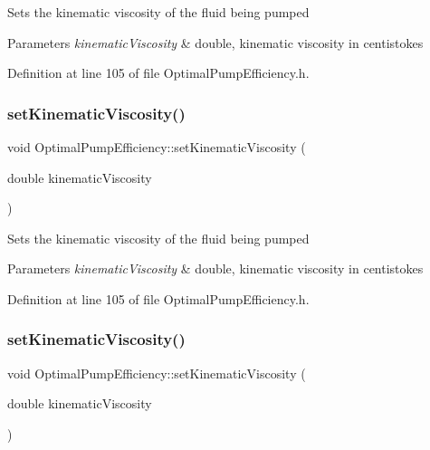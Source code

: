 Sets the kinematic viscosity of the fluid being pumped 
\begin{DoxyParams}{Parameters}
{\em kinematic\+Viscosity} & double, kinematic viscosity in centistokes \\
\hline
\end{DoxyParams}


Definition at line 105 of file Optimal\+Pump\+Efficiency.\+h.

\mbox{\label{class_optimal_pump_efficiency_a00017e0bd100beb2f4b0bf2db5e3687f}} 
\subsubsection{\texorpdfstring{set\+Kinematic\+Viscosity()}{setKinematicViscosity()}\hspace{0.1cm}{\footnotesize\ttfamily [2/3]}}
{\footnotesize\ttfamily void Optimal\+Pump\+Efficiency\+::set\+Kinematic\+Viscosity (\begin{DoxyParamCaption}\item[{double}]{kinematic\+Viscosity }\end{DoxyParamCaption})\hspace{0.3cm}{\ttfamily [inline]}}

Sets the kinematic viscosity of the fluid being pumped 
\begin{DoxyParams}{Parameters}
{\em kinematic\+Viscosity} & double, kinematic viscosity in centistokes \\
\hline
\end{DoxyParams}


Definition at line 105 of file Optimal\+Pump\+Efficiency.\+h.

\mbox{\label{class_optimal_pump_efficiency_a00017e0bd100beb2f4b0bf2db5e3687f}} 
\subsubsection{\texorpdfstring{set\+Kinematic\+Viscosity()}{setKinematicViscosity()}\hspace{0.1cm}{\footnotesize\ttfamily [3/3]}}
{\footnotesize\ttfamily void Optimal\+Pump\+Efficiency\+::set\+Kinematic\+Viscosity (\begin{DoxyParamCaption}\item[{double}]{kinematic\+Viscosity }\end{DoxyParamCaption})\hspace{0.3cm}{\ttfamily [inline]}}

